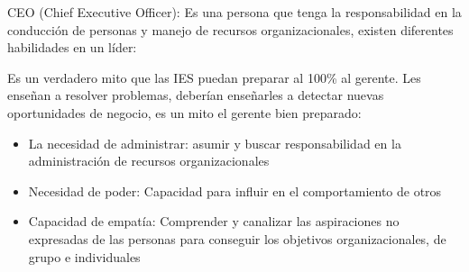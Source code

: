 CEO (Chief Executive Officer): Es una persona que tenga la responsabilidad en la conducción de personas y manejo de recursos organizacionales, existen diferentes habilidades en un líder:
\begin{center}
\end{center}
Es un verdadero mito que las IES puedan preparar al 100\% al gerente. Les enseñan a resolver problemas, deberían enseñarles a detectar nuevas oportunidades de negocio, es un mito el gerente bien preparado:
\begin{itemize}
    \item La necesidad de administrar: asumir y buscar responsabilidad en la administración de recursos organizacionales
    \item Necesidad de poder: Capacidad para influir en el comportamiento de otros
    \item Capacidad de empatía: Comprender y canalizar las aspiraciones no expresadas de las personas para conseguir los objetivos organizacionales, de grupo e individuales
\end{itemize}
